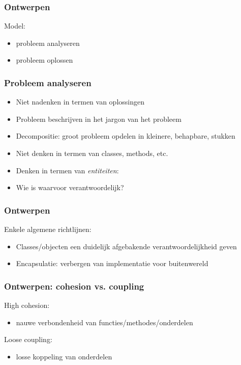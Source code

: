 \documentclass{beamer}
\begin{document}
\begin{frame}
\frametitle{Ontwerpen}
Model:
\begin{itemize}
\item probleem analyseren
\item probleem oplossen
\end{itemize}
\end{frame}


\begin{frame}
\frametitle{Probleem analyseren}
\begin{itemize}
\item Niet nadenken in termen van oplossingen
\item Probleem beschrijven in het jargon van het probleem
\item Decompositie: groot probleem opdelen in kleinere, behapbare, stukken
\item Niet denken in termen van classes, methods, etc.
\item Denken in termen van \emph{entiteiten}:
\item Wie is waarvoor verantwoordelijk?
\end{itemize}
\end{frame}

\begin{frame}
\frametitle{Ontwerpen}
Enkele algemene richtlijnen:
\begin{itemize}
\item Classes/objecten een duidelijk afgebakende verantwoordelijkheid geven
\item Encapsulatie: verbergen van implementatie voor buitenwereld
\end{itemize}
\end{frame}

\begin{frame}
\frametitle{Ontwerpen: cohesion vs. coupling}
High cohesion:
\begin{itemize}
\item nauwe verbondenheid van functies/methodes/onderdelen
\end{itemize}
Loose coupling:
\begin{itemize}
\item losse koppeling van onderdelen
\end{itemize}
\end{frame}
\end{document}

